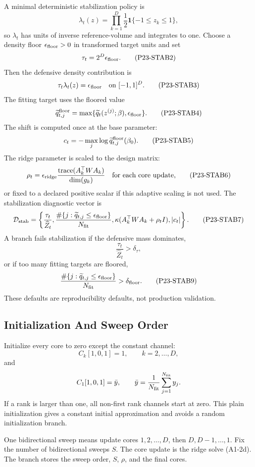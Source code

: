 \documentclass[11pt]{article}
\newcommand{\ind}{\mathbf 1}
\begin{document}
A minimal deterministic stabilization policy is
\[
    \lambda_t(z)=\prod_{k=1}^D\frac12\ind\{-1\le z_k\le1\},
    \tag{P23-STAB1}
\]
so \(\lambda_t\) has units of inverse reference-volume and integrates to one.
Choose a density floor \(\epsilon_{\rm floor}>0\) in transformed target units
and set
\[
    \tau_t=2^D\epsilon_{\rm floor}.
    \tag{P23-STAB2}
\]
Then the defensive density contribution is
\[
    \tau_t\lambda_t(z)=\epsilon_{\rm floor}
    \quad\text{on }[-1,1]^D.
    \tag{P23-STAB3}
\]
The fitting target uses the floored value
\[
    \widetilde q_{t,j}^{\rm floor}
    =
    \max\{\widetilde q_t(z^{(j)};\beta),\epsilon_{\rm floor}\}.
    \tag{P23-STAB4}
\]
The shift is computed once at the base parameter:
\[
    c_t
    =
    -\max_j\log \widetilde q_{t,j}^{\rm floor}(\beta_0).
    \tag{P23-STAB5}
\]
The ridge parameter is scaled to the design matrix:
\[
    \rho_t
    =
    \epsilon_{\rm ridge}
    \frac{\operatorname{trace}(A_k^\top W A_k)}
    {\dim(g_k)}
    \quad\text{for each core update,}
    \tag{P23-STAB6}
\]
or fixed to a declared positive scalar if this adaptive scaling is not used.
The stabilization diagnostic vector is
\[
    \mathcal D_{\rm stab}
    =
    \left\{
    \frac{\tau_t}{\widehat Z_t},
    \frac{\#\{j:\widetilde q_{t,j}\le\epsilon_{\rm floor}\}}{N_{\rm fit}},
    \kappa(A_k^\top W A_k+\rho_t I),
    |c_t|
    \right\}.
    \tag{P23-STAB7}
\]
A branch fails stabilization if the defensive mass dominates,
\[
    \frac{\tau_t}{\widehat Z_t}>\delta_\tau,
    \tag{P23-STAB8}
\]
or if too many fitting targets are floored,
\[
    \frac{\#\{j:\widetilde q_{t,j}\le\epsilon_{\rm floor}\}}{N_{\rm fit}}
    >
    \delta_{\rm floor}.
    \tag{P23-STAB9}
\]
These defaults are reproducibility defaults, not production validation.

\subsection{Initialization And Sweep Order}

Initialize every core to zero except the constant channel:
\[
    C_k[1,0,1]=1,\qquad k=2,\ldots,D,
\]
and
\[
    C_1[1,0,1]=\bar y,\qquad
    \bar y=\frac1{N_{\rm fit}}\sum_{j=1}^{N_{\rm fit}}y_j.
\]
If a rank is larger than one, all non-first rank channels start at zero.  This
plain initialization gives a constant initial approximation and avoids a random
initialization branch.

One bidirectional sweep means update cores \(1,2,\ldots,D\), then
\(D,D-1,\ldots,1\).  Fix the number of bidirectional sweeps \(S\).  The core
update is the ridge solve (A1-2d).  The branch stores the sweep order, \(S\),
\(\rho\), and the final cores.
\end{document}
